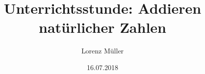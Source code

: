 %
% 
% 
%



\renewcommand{\Thema}{%
   Addieren natürlicher Zahlen}






\title{Unterrichtsstunde: Addieren natürlicher Zahlen}
\author{Lorenz Müller}
\date{16.07.2018}




\tableofcontents %













\printbibliography
\clearpage

\listoffigures %

\printacronyms[title={Abkürzungsverzeichnis}] %

\listoftables %

\onehalfspacing
